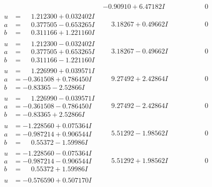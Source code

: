 \documentclass[1p]{elsarticle_modified}
\theoremstyle{definition}
\begin{document}
$$\begin{array}{c|c|c}
 & -0.90910 + 6.47182 I & \phantom{-0.000000 } 0 \\ \hline\begin{aligned}
u &= \phantom{-}1.212300 + 0.032402 I \\
a &= \phantom{-}0.377505 - 0.653265 I \\
b &= \phantom{-}0.311166 + 1.221160 I\end{aligned}
 & \phantom{-}3.18267 + 0.49662 I & \phantom{-0.000000 } 0 \\ \hline\begin{aligned}
u &= \phantom{-}1.212300 - 0.032402 I \\
a &= \phantom{-}0.377505 + 0.653265 I \\
b &= \phantom{-}0.311166 - 1.221160 I\end{aligned}
 & \phantom{-}3.18267 - 0.49662 I & \phantom{-0.000000 } 0 \\ \hline\begin{aligned}
u &= \phantom{-}1.226990 + 0.039571 I \\
a &= -0.361508 + 0.786450 I \\
b &= -0.83365 - 2.52866 I\end{aligned}
 & \phantom{-}9.27492 + 2.42864 I & \phantom{-0.000000 } 0 \\ \hline\begin{aligned}
u &= \phantom{-}1.226990 - 0.039571 I \\
a &= -0.361508 - 0.786450 I \\
b &= -0.83365 + 2.52866 I\end{aligned}
 & \phantom{-}9.27492 - 2.42864 I & \phantom{-0.000000 } 0 \\ \hline\begin{aligned}
u &= -1.228560 + 0.075364 I \\
a &= -0.987214 + 0.906544 I \\
b &= \phantom{-}0.55372 - 1.59986 I\end{aligned}
 & \phantom{-}5.51292 - 1.98562 I & \phantom{-0.000000 } 0 \\ \hline\begin{aligned}
u &= -1.228560 - 0.075364 I \\
a &= -0.987214 - 0.906544 I \\
b &= \phantom{-}0.55372 + 1.59986 I\end{aligned}
 & \phantom{-}5.51292 + 1.98562 I & \phantom{-0.000000 } 0 \\ \hline\begin{aligned}
u &= -0.576590 + 0.507170 I \\

\end{aligned}
\end{array}$$
\end{document}

